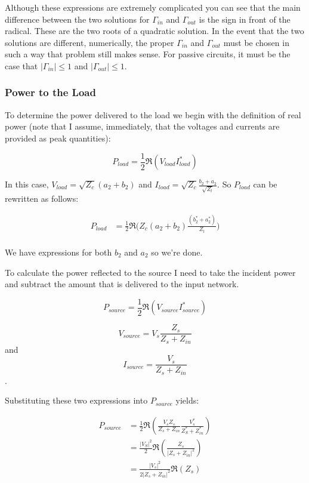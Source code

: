 Although these expressions are extremely complicated you can see that the main
difference between the two solutions for $\Gamma_{in}$ and $\Gamma_{out}$ is 
the sign in front of the radical. These are the two roots of a quadratic
solution. In the event that the two solutions are different, numerically, the
proper $\Gamma_{in}$ and $\Gamma_{out}$ must be chosen in such a way that
problem still makes sense. For passive circuits, it must be the case that
$\left| \Gamma_{in} \right| \le 1$ and $ \left| \Gamma_{out} \right| \le 1$. 
\subsubsection{Power to the Load}
To determine the power delivered to the load we begin with the definition of
real power (note that I assume, immediately, that the voltages and currents are
provided as peak quantities):

\[ 
        P_{load} =  \frac{1}{2}\Re\left( V_{load}I^*_{load} \right) 
\]

In this case, $V_{load} = \sqrt{Z_c} \left( a_2 + b_2 \right) $ and $I_{load}
=\sqrt{Z_c} \frac{b_2+a_2}{\sqrt{Z_l}}$. So $P_{load}$ can be rewritten as
follows:

\begin{align*}
    P_{load} &= \frac{1}{2}\Re\Big(Z_c \left( a_2+b_2 \right)\frac{\left( b_2^*+a_2^*
    \right)}{Z_l}\Big) \\
\end{align*}

We have expressions for both $b_2$ and $a_2$ so we're done.

To calculate the power reflected to the source I need to take the incident power
and subtract the amount that is delivered to the input network.

\[ 
        P_{source} = \frac{1}{2}\Re \left( V_{source}I^*_{source} \right) 
\]

$$V_{source} = V_s \frac{Z_s}{Z_s+Z_{in}}$$ and $$I_{source} =\frac{V_s}{Z_s +
Z_{in}}$$.

Substituting these two expressions into $P_{source}$ yields:

\begin{align*}
    P_{source} &= \frac{1}{2} \Re \left( \frac{V_s Z_s}{Z_s + Z_{in}}
\frac{V_s^*}{Z_S^* + Z_{in}^*} \right) \\
&= \frac{\left| V_S \right|^2}{2} \Re \left( \frac{Z_s}{|Z_s+Z_{in}|^2} \right)
\\
&= \frac{\left| V_s \right|^2}{2 \left| Z_s + Z_{in} \right|^2} \Re(Z_s)
\end{align*}

